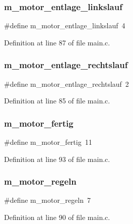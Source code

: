 \subsubsection{m\+\_\+motor\+\_\+entlage\+\_\+linkslauf}
{\footnotesize\ttfamily \#define m\+\_\+motor\+\_\+entlage\+\_\+linkslauf~4}



Definition at line 87 of file main.\+c.

\mbox{\label{main_8c_ac2c77c9beca00ad0c49b02ccc5901b32}} 
\subsubsection{m\+\_\+motor\+\_\+entlage\+\_\+rechtslauf}
{\footnotesize\ttfamily \#define m\+\_\+motor\+\_\+entlage\+\_\+rechtslauf~2}



Definition at line 85 of file main.\+c.

\mbox{\label{main_8c_a4ba6951533e2e28c2fe70601fba76014}} 
\subsubsection{m\+\_\+motor\+\_\+fertig}
{\footnotesize\ttfamily \#define m\+\_\+motor\+\_\+fertig~11}



Definition at line 93 of file main.\+c.

\mbox{\label{main_8c_a2e0ce3798542b98217a8e6311cd449ed}} 
\subsubsection{m\+\_\+motor\+\_\+regeln}
{\footnotesize\ttfamily \#define m\+\_\+motor\+\_\+regeln~7}



Definition at line 90 of file main.\+c.

\mbox{\label{main_8c_a11af8ae6331e63f01466b50dd8c5a33a}} 
